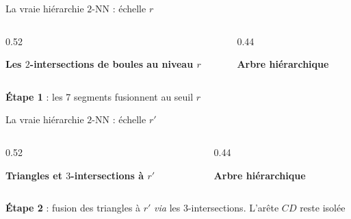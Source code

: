 \begin{frame}{La vraie hiérarchie $2$-NN : échelle $r$}
    \begin{columns}[c, onlytextwidth]
        \begin{column}{0.52\textwidth}
            \begin{center}
                \textbf{Les $2$-intersections de boules au niveau $r$}

                \vspace{0.4cm}
                
            \end{center}
        \end{column}

        \begin{column}{0.44\textwidth}
            \begin{center}
                \textcolor{inria-rouge}{\textbf{Arbre hiérarchique}}

                \vspace{0.4cm}
                
            \end{center}
        \end{column}
    \end{columns}
    \vspace{0.3cm}
    \begin{center}
        \small \textbf{Étape 1} : les 7 segments fusionnent au seuil $r$
    \end{center}
\end{frame}

\begin{frame}{La vraie hiérarchie $2$-NN : échelle $r'$}
    \begin{columns}[c, onlytextwidth]
        \begin{column}{0.52\textwidth}
            \begin{center}
                \textbf{Triangles et $3$-intersections à $r'$}

                \vspace{0.4cm}
                
            \end{center}
        \end{column}

        \begin{column}{0.44\textwidth}
            \begin{center}
                \textcolor{inria-rouge}{\textbf{Arbre hiérarchique}}

                \vspace{0.4cm}
                
            \end{center}
        \end{column}
    \end{columns}
    \vspace{0.3cm}
    \begin{center}
        \small \textbf{Étape 2} : fusion des triangles à $r'$ \emph{via} les $3$-intersections. L'arête $CD$ reste isolée
    \end{center}
\end{frame}

